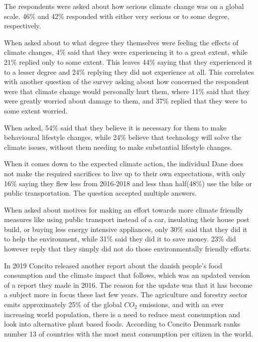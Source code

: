         The respondents were asked about how serious climate change was on a global scale. 46\% and 42\% responded with either very serious or to some degree, respectively. 
        
        When asked about to what degree they themselves were feeling the effects of climate changes, 4\% said that they were experiencing it to a great extent, while 21\% replied only to some extent. This leaves 44\% saying that they experienced it to a lesser degree and 24\% replying they did not experience at all\cite{concito}. This correlates with another question of the survey asking about how concerned the respondent were that climate change would personally hurt them, where 11\% said that they were greatly worried about damage to them, and 37\% replied that they were to some extent worried\cite{concito}.
        
        When asked, 54\% said that they believe it is necessary for them to make behavioural lifestyle changes, while 24\% believe that technology will solve the climate issues, without them needing to make substantial lifestyle changes\cite{concito}.

        When it comes down to the expected climate action, the individual Dane does not make the required sacrifices to live up to their own expectations, with only 16\% saying they flew less from 2016-2018 and less than half(48\%) use the bike or public transportation. The question accepted multiple answers\cite{concito}.
        
        When asked about motives for making an effort towards more climate friendly measures like using public transport instead of a car, insulating their house post build, or buying less energy intensive appliances, only 30\% said that they did it to help the environment, while 31\% said they did it to save money. 23\% did however reply that they simply did not do those environmentally friendly efforts\cite{concito}.
        
        In 2019 Concito released another report about the danish people's food consumption and the climate impact that follows, which was an updated version of a report they made in 2016. The reason for the update was that it has become a subject more in focus these last few years\cite{concitoFood}. The agriculture and forestry sector emits approximately 25\% of the global $CO_2$ emissions, and with an ever increasing world population, there is a need to reduce meat consumption and look into alternative plant based foods\cite{concitoFood}. According to Concito Denmark ranks number 13 of countries with the most meat consumption per citizen in the world\cite{concitoFood}.
        
